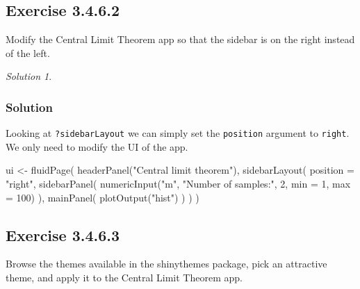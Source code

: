 \documentclass[
]{book}
\newenvironment{Shaded}{\begin{snugshade}}{\end{snugshade}}
\newcommand{\AttributeTok}[1]{\textcolor[rgb]{0.77,0.63,0.00}{#1}}
\newcommand{\DecValTok}[1]{\textcolor[rgb]{0.00,0.00,0.81}{#1}}
\newcommand{\FunctionTok}[1]{\textcolor[rgb]{0.00,0.00,0.00}{#1}}
\newcommand{\NormalTok}[1]{#1}
\newcommand{\OtherTok}[1]{\textcolor[rgb]{0.56,0.35,0.01}{#1}}
\newcommand{\StringTok}[1]{\textcolor[rgb]{0.31,0.60,0.02}{#1}}
\theoremstyle{definition}
\theoremstyle{definition}
\theoremstyle{definition}
\theoremstyle{definition}
\theoremstyle{remark}
\newtheorem*{solution}{Solution}
\begin{document}
\hypertarget{exercise-3.4.6.2}{%
\subsection*{Exercise 3.4.6.2}\label{exercise-3.4.6.2}}

Modify the Central Limit Theorem app so that the sidebar is on the right
instead of the left.

\begin{solution}
\leavevmode

\hypertarget{solution-13}{%
\subsubsection*{Solution}\label{solution-13}}

Looking at \texttt{?sidebarLayout} we can simply set the \texttt{position} argument to
\texttt{right}. We only need to modify the UI of the app.

\begin{Shaded}
\begin{Highlighting}[]
\NormalTok{ui }\OtherTok{\textless{}{-}} \FunctionTok{fluidPage}\NormalTok{(}
  \FunctionTok{headerPanel}\NormalTok{(}\StringTok{"Central limit theorem"}\NormalTok{),}
  \FunctionTok{sidebarLayout}\NormalTok{(}
    \AttributeTok{position =} \StringTok{"right"}\NormalTok{,}
    \FunctionTok{sidebarPanel}\NormalTok{(}
      \FunctionTok{numericInput}\NormalTok{(}\StringTok{"m"}\NormalTok{, }\StringTok{"Number of samples:"}\NormalTok{, }\DecValTok{2}\NormalTok{, }\AttributeTok{min =} \DecValTok{1}\NormalTok{, }\AttributeTok{max =} \DecValTok{100}\NormalTok{)}
\NormalTok{    ),}
    \FunctionTok{mainPanel}\NormalTok{(}
      \FunctionTok{plotOutput}\NormalTok{(}\StringTok{"hist"}\NormalTok{)}
\NormalTok{    )}
\NormalTok{  )}
\NormalTok{)}
\end{Highlighting}
\end{Shaded}

\end{solution}

\hypertarget{exercise-3.4.6.3}{%
\subsection*{Exercise 3.4.6.3}\label{exercise-3.4.6.3}}

Browse the themes available in the shinythemes package, pick an attractive
theme, and apply it to the Central Limit Theorem app.
\end{document}
